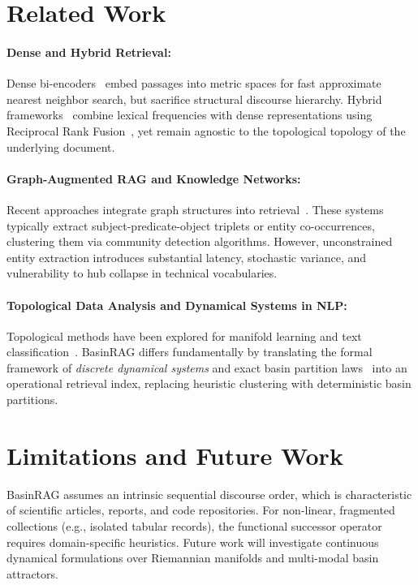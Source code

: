 \documentclass[10pt,twocolumn]{article}
\theoremstyle{definition}
\begin{document}
\section{Related Work}

\paragraph{Dense and Hybrid Retrieval:}
Dense bi-encoders~\cite{karpukhin2020dense,xiao2023c} embed passages into metric spaces for fast approximate nearest neighbor search, but sacrifice structural discourse hierarchy. Hybrid frameworks~\cite{formal2021splade} combine lexical frequencies with dense representations using Reciprocal Rank Fusion~\cite{cormack2009reciprocal}, yet remain agnostic to the topological topology of the underlying document.

\paragraph{Graph-Augmented RAG and Knowledge Networks:}
Recent approaches integrate graph structures into retrieval~\cite{pan2024unifying}. These systems typically extract subject-predicate-object triplets or entity co-occurrences, clustering them via community detection algorithms. However, unconstrained entity extraction introduces substantial latency, stochastic variance, and vulnerability to hub collapse in technical vocabularies.

\paragraph{Topological Data Analysis and Dynamical Systems in NLP:}
Topological methods have been explored for manifold learning and text classification~\cite{carlsson2009topology}. BasinRAG differs fundamentally by translating the formal framework of \textit{discrete dynamical systems} and exact basin partition laws~\cite{martins2026iterated} into an operational retrieval index, replacing heuristic clustering with deterministic basin partitions.

\section{Limitations and Future Work}

BasinRAG assumes an intrinsic sequential discourse order, which is characteristic of scientific articles, reports, and code repositories. For non-linear, fragmented collections (e.g., isolated tabular records), the functional successor operator requires domain-specific heuristics. Future work will investigate continuous dynamical formulations over Riemannian manifolds and multi-modal basin attractors.
\end{document}
